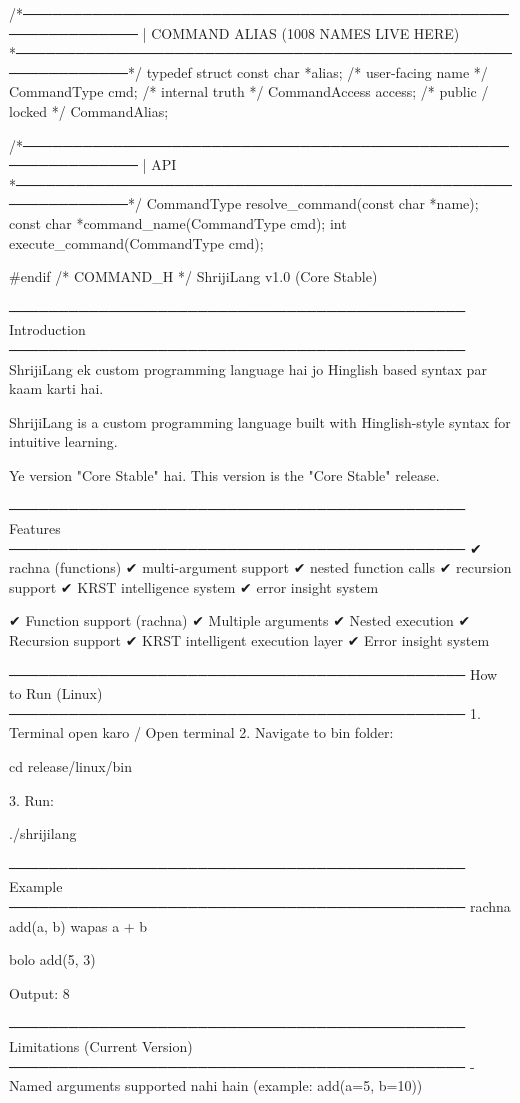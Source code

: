 \documentclass{article}
\begin{document}
/*──────────────────────────────────────────────────────────────
 | COMMAND ALIAS (1008 NAMES LIVE HERE)
 *──────────────────────────────────────────────────────────────*/
typedef struct {
    const char     *alias;     /* user-facing name */
    CommandType     cmd;       /* internal truth */
    CommandAccess   access;    /* public / locked */
} CommandAlias;


/*──────────────────────────────────────────────────────────────
 | API
 *──────────────────────────────────────────────────────────────*/
CommandType resolve_command(const char *name);
const char *command_name(CommandType cmd);
int execute_command(CommandType cmd);

#endif /* COMMAND_H */
ShrijiLang v1.0 (Core Stable)

──────────────────────────────────────────────
Introduction
──────────────────────────────────────────────
ShrijiLang ek custom programming language hai
jo Hinglish based syntax par kaam karti hai.

ShrijiLang is a custom programming language
built with Hinglish-style syntax for intuitive learning.

Ye version "Core Stable" hai.
This version is the "Core Stable" release.

──────────────────────────────────────────────
Features
──────────────────────────────────────────────
✔ rachna (functions)
✔ multi-argument support
✔ nested function calls
✔ recursion support
✔ KRST intelligence system
✔ error insight system

✔ Function support (rachna)
✔ Multiple arguments
✔ Nested execution
✔ Recursion support
✔ KRST intelligent execution layer
✔ Error insight system

──────────────────────────────────────────────
How to Run (Linux)
──────────────────────────────────────────────
1. Terminal open karo / Open terminal
2. Navigate to bin folder:

   cd release/linux/bin

3. Run:

   ./shrijilang

──────────────────────────────────────────────
Example
──────────────────────────────────────────────
rachna add(a, b) {
    wapas a + b
}

bolo add(5, 3)

Output:
8

──────────────────────────────────────────────
Limitations (Current Version)
──────────────────────────────────────────────
- Named arguments supported nahi hain
  (example: add(a=5, b=10))
\end{document}
